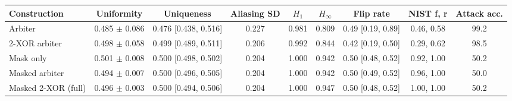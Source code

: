 \begin{tabular}{lcccccccc}
\toprule
Construction & Uniformity & Uniqueness & Aliasing SD & $H_1$ & $H_\infty$ & Flip rate & NIST f, r & Attack acc. \\
\midrule
Arbiter & 0.485 $\pm$ 0.086 & 0.476 [0.438, 0.516] & 0.227 & 0.981 & 0.809 & 0.49 [0.19, 0.89] & 0.46, 0.58 & 99.2 \\
2-XOR arbiter & 0.498 $\pm$ 0.058 & 0.499 [0.489, 0.511] & 0.206 & 0.992 & 0.844 & 0.42 [0.19, 0.50] & 0.29, 0.62 & 98.5 \\
Mask only & 0.501 $\pm$ 0.008 & 0.500 [0.498, 0.502] & 0.204 & 1.000 & 0.942 & 0.50 [0.48, 0.52] & 0.92, 1.00 & 50.2 \\
Masked arbiter & 0.494 $\pm$ 0.007 & 0.500 [0.496, 0.505] & 0.204 & 1.000 & 0.942 & 0.50 [0.49, 0.52] & 0.96, 1.00 & 50.0 \\
Masked 2-XOR (full) & 0.496 $\pm$ 0.003 & 0.500 [0.494, 0.506] & 0.204 & 1.000 & 0.947 & 0.50 [0.48, 0.52] & 1.00, 1.00 & 50.2 \\
\bottomrule
\end{tabular}
